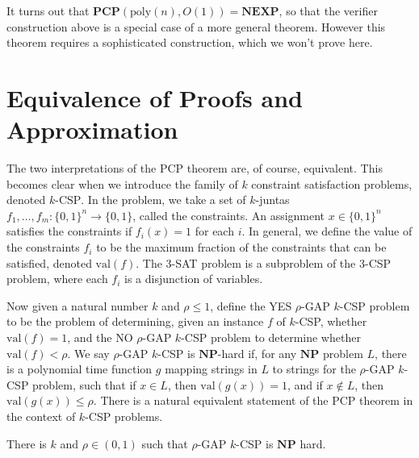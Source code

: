 It turns out that $\mathbf{PCP}(\text{poly}(n), O(1)) = \mathbf{NEXP}$, so that the verifier construction above is a special case of a more general theorem. However this theorem requires a sophisticated construction, which we won't prove here.

\section{Equivalence of Proofs and Approximation}

The two interpretations of the PCP theorem are, of course, equivalent. This becomes clear when we introduce the family of $k$ constraint satisfaction problems, denoted $k$-$\text{CSP}$. In the problem, we take a set of $k$-juntas $f_1, \dots, f_m: \{ 0,1 \}^n \to \{ 0,1 \}$, called the constraints. An assignment $x \in \{ 0, 1 \}^n$ satisfies the constraints if $f_i(x) = 1$ for each $i$. In general, we define the value of the constraints $f_i$ to be the maximum fraction of the constraints that can be satisfied, denoted $\text{val}(f)$. The 3-SAT problem is a subproblem of the 3-CSP problem, where each $f_i$ is a disjunction of variables.

Now given a natural number $k$ and $\rho \leq 1$, define the YES $\rho$-GAP $k$-CSP problem to be the problem of determining, given an instance $f$ of $k$-CSP, whether $\text{val}(f) = 1$, and the NO $\rho$-GAP $k$-CSP problem to determine whether $\text{val}(f) < \rho$. We say $\rho$-GAP $k$-CSP is $\mathbf{NP}$-hard if, for any $\mathbf{NP}$ problem $L$, there is a polynomial time function $g$ mapping strings in $L$ to strings for the $\rho$-GAP $k$-CSP problem, such that if $x \in L$, then $\text{val}(g(x)) = 1$, and if $x \not \in L$, then $\text{val}(g(x)) \leq \rho$. There is a natural equivalent statement of the PCP theorem in the context of $k$-CSP problems.

\begin{theorem}
    There is $k$ and $\rho \in (0,1)$ such that $\rho$-GAP $k$-CSP is $\mathbf{NP}$ hard.
\end{theorem}

